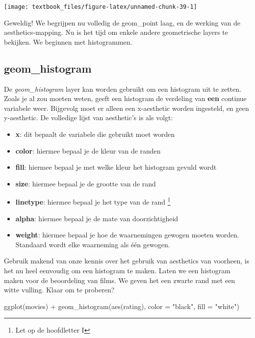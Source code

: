\documentclass[]{tufte-book}
\newenvironment{Shaded}{}{}
\newcommand{\AttributeTok}[1]{\textcolor[rgb]{0.49,0.56,0.16}{#1}}
\newcommand{\FunctionTok}[1]{\textcolor[rgb]{0.02,0.16,0.49}{#1}}
\newcommand{\NormalTok}[1]{#1}
\newcommand{\SpecialCharTok}[1]{\textcolor[rgb]{0.25,0.44,0.63}{#1}}
\newcommand{\StringTok}[1]{\textcolor[rgb]{0.25,0.44,0.63}{#1}}
\providecommand{\tightlist}{%
  \setlength{\itemsep}{0pt}\setlength{\parskip}{0pt}}
\begin{document}
\texttt{[image: textbook\_files/figure-latex/unnamed-chunk-39-1]}

Geweldig! We begrijpen nu volledig de geom\_point laag, en de werking van de aesthetics-mapping. Nu is het tijd om enkele andere geometrische layers te bekijken. We beginnen met histogrammen.

\hypertarget{geom_histogram}{%
\subsection{geom\_histogram}\label{geom_histogram}}

De \emph{geom\_histogram} layer kan worden gebruikt om een histogram uit te zetten. Zoals je al zou moeten weten, geeft een histogram de verdeling van \textbf{een} continue variabele weer. Bijgevolg moet er alleen een x-aesthetic worden ingesteld, en geen y-aesthetic. De volledige lijst van aesthetic's is als volgt:

\begin{itemize}
\tightlist
\item
  \textbf{x}: dit bepaalt de variabele die gebruikt moet worden
\item
  \textbf{color}: hiermee bepaal je de kleur van de randen
\item
  \textbf{fill}: hiermee bepaal je met welke kleur het histogram gevuld wordt
\item
  \textbf{size}: hiermee bepaal je de grootte van de rand
\item
  \textbf{linetype}: hiermee bepaal je het type van de rand \footnote{Let op de hoofdletter I}
\item
  \textbf{alpha}: hiermee bepaal je de mate van doorzichtigheid
\item
  \textbf{weight}: hiermee bepaal je hoe de waarnemingen gewogen moeten worden. Standaard wordt elke waarneming als één gewogen.
\end{itemize}

Gebruik makend van onze kennis over het gebruik van aesthetics van voorheen, is het nu heel eenvoudig om een histogram te maken. Laten we een histogram maken voor de beoordeling van films. We geven het een zwarte rand met een witte vulling. Klaar om te proberen?

\begin{Shaded}
\begin{Highlighting}[]
\FunctionTok{ggplot}\NormalTok{(movies) }\SpecialCharTok{+}
  \FunctionTok{geom\_histogram}\NormalTok{(}\FunctionTok{aes}\NormalTok{(rating), }\AttributeTok{color =} \StringTok{"black"}\NormalTok{, }\AttributeTok{fill =} \StringTok{"white"}\NormalTok{)}
\end{Highlighting}
\end{Shaded}
\end{document}
